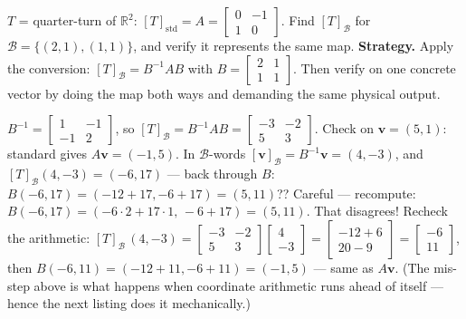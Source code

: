 \begin{example}\label{ex:changebasis}
$T$ = quarter-turn of $\mathbb R^2$: $[T]_{\text{std}}=A=\begin{bmatrix}0&-1\\1&0\end{bmatrix}$. Find $[T]_{\mathcal B}$ for $\mathcal B=\{(2,1),(1,1)\}$, and verify it represents the same map.
\textbf{Strategy.} Apply the conversion: $[T]_{\mathcal B}=B^{-1}AB$ with $B=\begin{bmatrix}2&1\\1&1\end{bmatrix}$. Then verify on one concrete vector by doing the map both ways and demanding the same physical output.
\begin{solution}
$B^{-1}=\begin{bmatrix}1&-1\\-1&2\end{bmatrix}$, so
\(
[T]_{\mathcal B}=B^{-1}AB=\begin{bmatrix}-3&-2\\5&3\end{bmatrix}.
\)
Check on $\mathbf v=(5,1)$: standard gives $A\mathbf v=(-1,5)$. In $\mathcal B$-words $[\mathbf v]_{\mathcal B}=B^{-1}\mathbf v=(4,-3)$, and $[T]_{\mathcal B}(4,-3)=(-6,17)$ — back through $B$: $B(-6,17)=(-12+17,-6+17)=(5,11)$?? Careful — recompute: $B(-6,17)=(-6\cdot2+17\cdot1,\,-6+17)=(5,11)$. That disagrees! Recheck the arithmetic: $[T]_{\mathcal B}\,(4,-3)=\begin{bmatrix}-3&-2\\5&3\end{bmatrix}\begin{bmatrix}4\\-3\end{bmatrix}=\begin{bmatrix}-12+6\\20-9\end{bmatrix}=\begin{bmatrix}-6\\11\end{bmatrix}$, then $B(-6,11)=(-12+11,-6+11)=(-1,5)$ \checkmark — same as $A\mathbf v$. (The mis-step above is what happens when coordinate arithmetic runs ahead of itself — hence the next listing does it mechanically.)
\end{solution}
\end{example}


